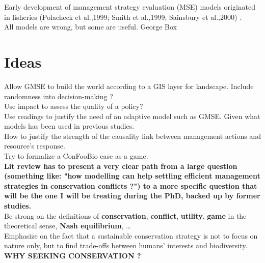 \documentclass[12pt]{article}
\begin{document}
Early  development  of  management  strategy  evaluation  (MSE)  models  originated  in  fisheries (Polacheck  et  al.,1999; Smith  et  al.,1999; Sainsbury  et  al.,2000) \citep{duthie2018}.\\

All models are wrong, but some are useful. George Box

\section*{Ideas}
Allow GMSE to build the world according to a GIS layer for landscape.
Include randomness into decision-making ?\\
Use impact to assess the quality of a policy?\\
Use readings to justify the need of an adaptive model such as GMSE. Given what models has been used in previous studies.\\
How to justify the strength of the causality link between management actions and resource's response.\\
Try to formalize a ConFooBio case as a game.\\
\textbf{Lit review has to present a very clear path from a large question (something like: "how modelling can help settling efficient management strategies in conservation conflicts ?") to a more specific question that will be the one I will be treating during the PhD, backed up by former studies.}\\
Be strong on the definitions of \textbf{conservation}, \textbf{conflict}, \textbf{utility}, \textbf{game} in the theoretical sense, \textbf{Nash equilibrium}, \dots\\
Emphasize on the fact that a sustainable conservation strategy is not to focus on nature only, but to find trade-offs between humans' interests and biodiversity.
\textbf{WHY SEEKING CONSERVATION ?}
\end{document}
